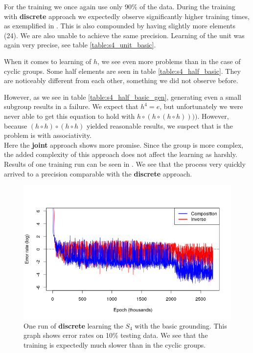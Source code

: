 For the training we once again use only 90\% of the data. During the training with \textbf{discrete} approach we expectedly observe significantly higher training times, as exemplified in . This is also compounded by having slightly more elements (24). We are also unable to achieve the same precision. Learning of the unit was again very precise, see table \ref{table:s4_unit_basic}.

When it comes to learning of $h$, we see even more problems than in the case of cyclic groups. Some half elements are seen in table \ref{table:s4_half_basic}. They are noticeably different from each other, something we did not observe before.

However, as we see in table \ref{table:s4_half_basic_gen}, generating even a small subgroup results in a failure. We expect that $h^4=e$, but unfortunately we were never able to get this equation to hold with $h\circ(h\circ(h\circ h))))$. However, because $(h\circ h)\circ (h\circ h)$ yielded reasonable results, we suspect that is the problem is with associativity.\\


Here the \textbf{joint} approach shows more promise. Since the group is more complex, the added complexity of this approach does not affect the learning as harshly. Results of one training run can be seen in . We see that the process very quickly arrived to a precision comparable with the \textbf{discrete} approach.

\begin{figure}
\caption{One run of \textbf{discrete} learning the $S_4$ with the basic grounding. This graph shows error rates on 10\% testing data. We see that the training is expectedly much slower than in the cyclic groups.}
\label{graph:s4_basic}
\includegraphics[width=0.9\linewidth]{../img/s4_comp+inv.png}
\end{figure}

